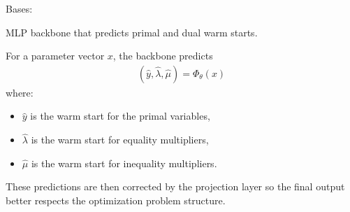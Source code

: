 \documentclass[letterpaper,10pt,english,openany,oneside]{sphinxmanual}
\begin{document}
\begin{fulllineitems}
\label{\detokenize{api/core/opt/models_backbone:opt.models.backbone.Backbone}}
\pysigstartsignatures
{}
\pysigstopsignatures
\sphinxAtStartPar
Bases: 

\sphinxAtStartPar
MLP backbone that predicts primal and dual warm starts.

\sphinxAtStartPar
For a parameter vector \(x\), the backbone predicts
\begin{equation*}
\begin{split}(\hat y, \hat \lambda, \hat \mu) = \Phi_\theta(x)\end{split}
\end{equation*}
\sphinxAtStartPar
where:
\begin{itemize}
\item {} 
\sphinxAtStartPar
\(\hat y\) is the warm start for the primal variables,

\item {} 
\sphinxAtStartPar
\(\hat \lambda\) is the warm start for equality multipliers,

\item {} 
\sphinxAtStartPar
\(\hat \mu\) is the warm start for inequality multipliers.

\end{itemize}

\sphinxAtStartPar
These predictions are then corrected by the projection layer so the final
output better respects the optimization problem structure.

\begin{fulllineitems}
\label{\detokenize{api/core/opt/models_backbone:opt.models.backbone.Backbone.p}}
\pysigstartsignatures
{}
\pysigstopsignatures
\end{fulllineitems}


\end{fulllineitems}
\end{document}
